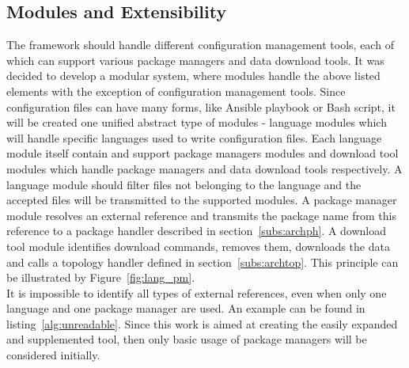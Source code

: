 \subsection{Modules and Extensibility}
The framework should handle different configuration management tools, each of which can support various package managers and data download tools.
It was decided to develop a modular system, where modules handle the above listed elements with the exception of configuration management tools.
Since configuration files can have many forms, like Ansible playbook or Bash script, it will be created one unified abstract type of modules - language modules which will handle specific languages used to write configuration files.
Each language module itself contain and support package managers modules and download tool modules which handle package managers and data download tools respectively.
A language module should filter files not belonging to the language and the accepted files will be transmitted to the supported modules.
A package manager module resolves an external reference and transmits the package name from this reference to a package handler described in section~\ref{subs:archph}.
A download tool module identifies download commands, removes them, downloads the data and calls a topology handler defined in section~\ref{subs:archtop}. 
This principle can be illustrated by Figure~\ref{fig:lang_pm}.
\\
It is impossible to identify all types of external references, even when only one language and one package manager are used.
An example can be found in listing~\ref{alg:unreadable}.
Since this work is aimed at creating the easily expanded and supplemented tool, then only basic usage of package managers will be considered initially.\\
